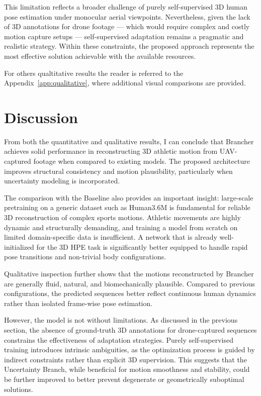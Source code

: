 This limitation reflects a broader challenge of purely self-supervised 3D human pose estimation under monocular aerial viewpoints. Nevertheless, given the lack of 3D annotations for drone footage — which 
would require complex and costly motion capture setups — self-supervised adaptation remains a pragmatic and realistic strategy. Within these constraints, the proposed approach represents the most effective 
solution achievable with the available resources.

For others qualtitative results the reader is referred to the Appendix~\ref{app:qualitative}, where additional visual comparisons are provided.

\section{Discussion}
From both the quantitative and qualitative results, I can conclude that Brancher achieves solid performance in reconstructing 3D athletic motion from UAV-captured footage when compared to existing models. 
The proposed architecture improves structural consistency and motion plausibility, particularly when uncertainty modeling is incorporated.

The comparison with the Baseline also provides an important insight: large-scale pretraining on a generic dataset such as Human3.6M is fundamental for reliable 3D reconstruction of complex sports motions. 
Athletic movements are highly dynamic and structurally demanding, and training a model from scratch on limited domain-specific data is insufficient. A network that is already well-initialized for the 3D HPE 
task is significantly better equipped to handle rapid pose transitions and non-trivial body configurations.

Qualitative inspection further shows that the motions reconstructed by Brancher are generally fluid, natural, and biomechanically plausible. Compared to previous configurations, the predicted sequences 
better reflect continuous human dynamics rather than isolated frame-wise pose estimation.

However, the model is not without limitations. As discussed in the previous section, the absence of ground-truth 3D annotations for drone-captured sequences constrains the effectiveness of adaptation 
strategies. Purely self-supervised training introduces intrinsic ambiguities, as the optimization process is guided by indirect constraints rather than explicit 3D supervision. This suggests that the 
Uncertainty Branch, while beneficial for motion smoothness and stability, could be further improved to better prevent degenerate or geometrically suboptimal solutions.

